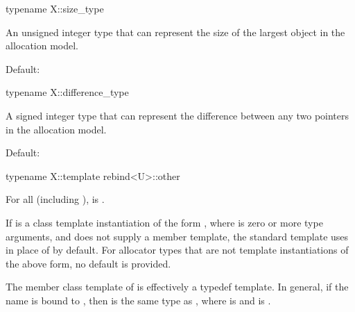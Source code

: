 \begin{itemdecl}
typename X::size_type
\end{itemdecl}

\begin{itemdescr}
\pnum
\result
An unsigned integer type
that can represent the size of the largest object in the allocation model.

\pnum
\remarks
Default:
\end{itemdescr}

\begin{itemdecl}
typename X::difference_type
\end{itemdecl}

\begin{itemdescr}
\pnum
\result
A signed integer type that can represent
the difference between any two pointers in the allocation model.

\pnum
\remarks
Default:
\end{itemdescr}

\begin{itemdecl}
typename X::template rebind<U>::other
\end{itemdecl}

\begin{itemdescr}
\pnum
\result
{}

\pnum
\ensures
For all  (including ),
 is .

\pnum
\remarks
If  is a class template instantiation of the form
, where  is zero or more type
arguments, and  does not supply a  member
template, the standard  template uses
 in place of 
by default. For allocator types that are not template instantiations of the
above form, no default is provided.

\pnum
\begin{note}
The member class template  of  is
effectively a typedef template.
In general, if
the name  is bound to , then
 is the same type as
, where
 is  and
 is .
\end{note}
\end{itemdescr}

